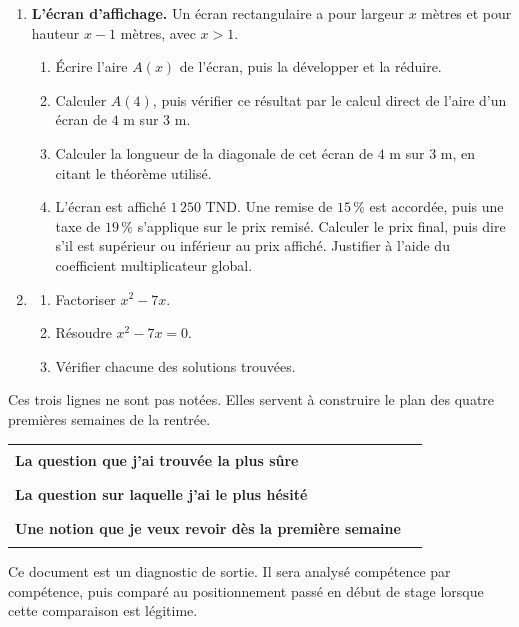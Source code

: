 \documentclass[10pt,a4paper]{article}
\begin{document}
\needspace{68mm}\par\vspace{3mm}
\begin{enumerate}
\needspace{22mm}
\item[\textbf{C1.}] \textbf{L'écran d'affichage.} Un écran rectangulaire a pour largeur $x$ mètres et pour
hauteur $x - 1$ mètres, avec $x > 1$.
\begin{enumerate}
\item Écrire l'aire $A(x)$ de l'écran, puis la développer et la réduire.
\item Calculer $A(4)$, puis vérifier ce résultat par le calcul direct de l'aire d'un écran de $4$ m sur $3$ m.
\item Calculer la longueur de la diagonale de cet écran de $4$ m sur $3$ m, en citant le théorème utilisé.
\item L'écran est affiché $1\,250$ TND. Une remise de $15\,\%$ est accordée, puis une taxe de $19\,\%$ s'applique
sur le prix remisé. Calculer le prix final, puis dire s'il est supérieur ou inférieur au prix affiché.
Justifier à l'aide du coefficient multiplicateur global.
\end{enumerate}
\par\vspace{1.2mm}
\needspace{22mm}
\item[\textbf{C2.}] \begin{enumerate}
\item Factoriser $x^2 - 7x$.
\item Résoudre $x^2 - 7x = 0$.
\item Vérifier chacune des solutions trouvées.
\end{enumerate}
\par\vspace{1.2mm}
\end{enumerate}
\brouillon{\dimexpr\textheight/3\relax}
\newpage
{}
\begin{methodbox}Ces trois lignes ne sont pas notées. Elles servent à construire le plan des quatre premières semaines de la rentrée.\end{methodbox}
\par\noindent\begin{tabularx}{\linewidth}{>{\bfseries}p{62mm} X}
\toprule
La question que j'ai trouvée la plus sûre & \rule{85mm}{0.32pt} \\
La question sur laquelle j'ai le plus hésité & \rule{85mm}{0.32pt} \\
Une notion que je veux revoir dès la première semaine & \rule{85mm}{0.32pt} \\
\bottomrule\end{tabularx}
\vfill
\begin{graybox}\small Ce document est un diagnostic de sortie. Il sera analysé compétence par compétence, puis comparé au positionnement passé en début de stage lorsque cette comparaison est légitime.\end{graybox}
\end{document}
